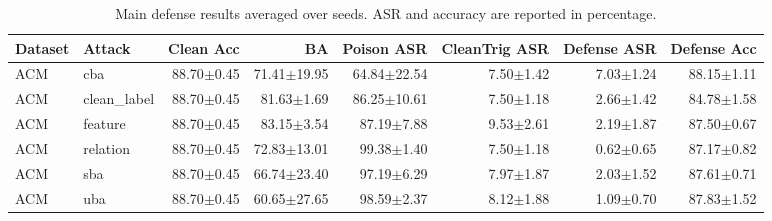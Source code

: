 \begin{table}[t]
\centering
\caption{Main defense results averaged over seeds. ASR and accuracy are reported in percentage.}
\label{tab:main_results}
\begin{tabular}{llrrrrrr}
\toprule
Dataset & Attack & Clean Acc & BA & Poison ASR & CleanTrig ASR & Defense ASR & Defense Acc \\
\midrule
ACM & cba & 88.70$\pm$0.45 & 71.41$\pm$19.95 & 64.84$\pm$22.54 & 7.50$\pm$1.42 & 7.03$\pm$1.24 & 88.15$\pm$1.11 \\
ACM & clean_label & 88.70$\pm$0.45 & 81.63$\pm$1.69 & 86.25$\pm$10.61 & 7.50$\pm$1.18 & 2.66$\pm$1.42 & 84.78$\pm$1.58 \\
ACM & feature & 88.70$\pm$0.45 & 83.15$\pm$3.54 & 87.19$\pm$7.88 & 9.53$\pm$2.61 & 2.19$\pm$1.87 & 87.50$\pm$0.67 \\
ACM & relation & 88.70$\pm$0.45 & 72.83$\pm$13.01 & 99.38$\pm$1.40 & 7.50$\pm$1.18 & 0.62$\pm$0.65 & 87.17$\pm$0.82 \\
ACM & sba & 88.70$\pm$0.45 & 66.74$\pm$23.40 & 97.19$\pm$6.29 & 7.97$\pm$1.87 & 2.03$\pm$1.52 & 87.61$\pm$0.71 \\
ACM & uba & 88.70$\pm$0.45 & 60.65$\pm$27.65 & 98.59$\pm$2.37 & 8.12$\pm$1.88 & 1.09$\pm$0.70 & 87.83$\pm$1.52 \\
\bottomrule
\end{tabular}
\end{table}
